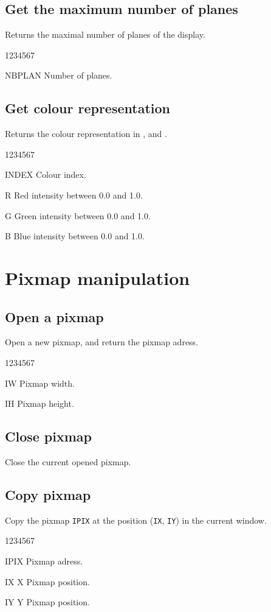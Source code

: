 \subsection{Get the maximum number of planes}
%
\Action
Returns the maximal number of planes of the display.
\Pdesc
\begin{DLtt}{1234567}
\item[NBPLAN] Number of planes.
\end{DLtt}
\subsection{Get colour representation}
%
\Action
Returns the  colour representation in ,  and .
\Pdesc
\begin{DLtt}{1234567}
\item[INDEX] Colour index.
\item[R] Red intensity between 0.0 and 1.0.
\item[G] Green intensity between 0.0 and 1.0.
\item[B] Blue intensity between 0.0 and 1.0.
\end{DLtt}
%
%
\section{Pixmap manipulation}
\subsection{Open a pixmap}
%
\Action
Open a new pixmap, and return the pixmap adress.
\Pdesc
\begin{DLtt}{1234567}
\item[IW] Pixmap width.
\item[IH] Pixmap height.
\end{DLtt}

\newpage%

\subsection{Close pixmap}
%
\Action
Close the current opened pixmap.

\subsection{Copy pixmap}
%
\Action
Copy the pixmap {\tt IPIX} at the position ({\tt IX}, {\tt IY}) in the
current window.
\begin{DLtt}{1234567}
\item[IPIX] Pixmap adress.
\item[IX] X Pixmap position.
\item[IY] Y Pixmap position.
\end{DLtt}


